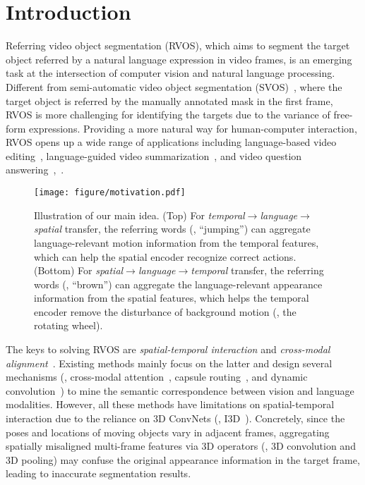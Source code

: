 \documentclass[10pt,twocolumn,letterpaper]{article}
\begin{document}
\section{Introduction}
\label{sec:intro}

Referring video object segmentation (RVOS), which aims to segment the target object referred by a natural language expression in video frames, is an emerging task at the intersection of computer vision and natural language processing.
Different from semi-automatic video object segmentation (SVOS)~\cite{wang2021swiftnet,park2021learning,duke2021sstvos,ge2021video}, where the target object is referred by the manually annotated mask in the first frame, RVOS is more challenging for identifying the targets due to the variance of free-form expressions. Providing a more natural way for human-computer interaction, RVOS opens up a wide range of applications including language-based video editing~\cite{fu2021language}, language-guided video summarization~\cite{narasimhan2021clip}, and video question answering~\cite{jang2017tgif,xu2016msr},~\etc.

\begin{figure}[t]
	\centering
		\texttt{[image: figure/motivation.pdf]}
	\caption{Illustration of our main idea. (Top) For \textit{temporal}$\rightarrow$\textit{language}$\rightarrow$\textit{spatial} transfer, the referring words (\eg, ``jumping'') can aggregate language-relevant motion information from the temporal features, which can help the spatial encoder recognize correct actions. (Bottom) For \textit{spatial}$\rightarrow$\textit{language}$\rightarrow$\textit{temporal} transfer, the referring words (\eg, ``brown'') can aggregate the language-relevant appearance information from the spatial features, which helps the temporal encoder remove the disturbance of background motion (\eg, the rotating wheel).}

	\label{fig:motivation}
	
\end{figure}

The keys to solving RVOS are \textit{spatial-temporal interaction} and \textit{cross-modal alignment}~\cite{HuiH0DLWH021,ye2021referring}. Existing methods mainly focus on the latter and design several mechanisms (\eg, cross-modal attention~\cite{WangDYT19,NingXW020}, capsule routing~\cite{mcintosh2020visual}, and dynamic convolution~\cite{GavrilyukGLS18, WangDMY20}) to mine the semantic correspondence between vision and language modalities. However, all these methods have limitations on spatial-temporal 
interaction due to the reliance on 3D ConvNets (\eg, I3D~\cite{CarreiraZ17}). Concretely, since the poses and locations of moving objects vary in adjacent frames, aggregating spatially misaligned multi-frame features via 3D operators (\eg, 3D convolution and 3D pooling) may confuse the original appearance information in the target frame, leading to inaccurate segmentation results.
\end{document}
